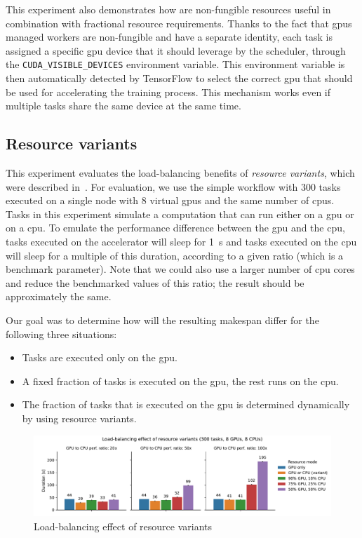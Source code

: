 This experiment also demonstrates how are non-fungible resources useful in combination with
fractional resource requirements. Thanks to the fact that \glspl{gpu} managed \hyperqueue{} workers
are non-fungible and have a separate identity, each task is assigned a specific \gls{gpu}
device that it should leverage by the scheduler, through the \texttt{CUDA\_VISIBLE\_DEVICES}
environment variable. This environment variable is then automatically detected by TensorFlow to
select the correct \gls{gpu} that should be used for accelerating the training process. This
mechanism works even if multiple tasks share the same device at the same time.

\subsection{Resource variants}
\label{sec:hq-exp-resource-variants}
This experiment evaluates the load-balancing benefits of \emph{resource variants}, which were
described in~. For evaluation, we use the simple workflow with
$300$ tasks executed on a single node with $8$ virtual
\glspl{gpu} and the same number of \glspl{cpu}. Tasks in this experiment
simulate a computation that can run either on a \gls{gpu} or on a
\gls{cpu}. To emulate the performance difference between the \gls{gpu}
and the \gls{cpu}, tasks executed on the accelerator will sleep for
\SI{1}{\second} and tasks executed on the \gls{cpu} will sleep for a
multiple of this duration, according to a given ratio (which is a benchmark parameter).
Note that we could also use a larger number of \gls{cpu} cores and reduce the benchmarked values
of this ratio; the result should be approximately the same.

Our goal was to determine how will the resulting makespan differ for the following three
situations:
\begin{itemize}[itemsep=0pt,topsep=2pt]
	\item Tasks are executed only on the \gls{gpu}.
	\item A fixed fraction of tasks is executed on the \gls{gpu}, the rest runs on the
	      \gls{cpu}.
	\item The fraction of tasks that is executed on the \gls{gpu} is determined dynamically by
	      \hyperqueue{} using resource variants.
\end{itemize}

\begin{figure}[h]
	\centering
	\includegraphics[width=\textwidth]{imgs/hq/charts/alternative-resources}
	\caption{Load-balancing effect of resource variants}
	\label{fig:hq-resource-variants}
\end{figure}

